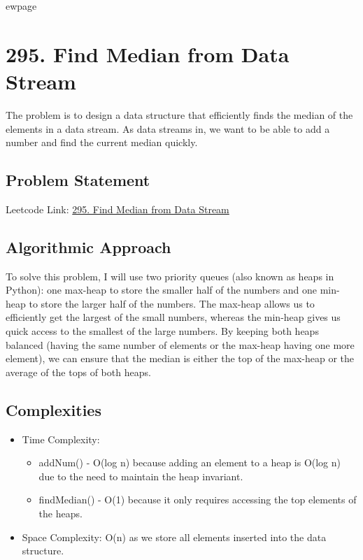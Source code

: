 
ewpage
\chapter{295. Find Median from Data Stream}
\label{chap:find_median_from_data_stream}

The problem is to design a data structure that efficiently finds the median of the elements in a data stream. As data streams in, we want to be able to add a number and find the current median quickly.

\section*{Problem Statement}
Leetcode Link: \href{https://leetcode.com/problems/find-median-from-data-stream/}{295. Find Median from Data Stream}

\section*{Algorithmic Approach}
To solve this problem, I will use two priority queues (also known as heaps in Python): one max-heap to store the smaller half of the numbers and one min-heap to store the larger half of the numbers. The max-heap allows us to efficiently get the largest of the small numbers, whereas the min-heap gives us quick access to the smallest of the large numbers. By keeping both heaps balanced (having the same number of elements or the max-heap having one more element), we can ensure that the median is either the top of the max-heap or the average of the tops of both heaps.

\section*{Complexities}
\begin{itemize}
    \item Time Complexity:
      \begin{itemize}
        \item addNum() - O(log n) because adding an element to a heap is O(log n) due to the need to maintain the heap invariant.
        \item findMedian() - O(1) because it only requires accessing the top elements of the heaps.
      \end{itemize}
    \item Space Complexity: O(n) as we store all elements inserted into the data structure.
\end{itemize}



